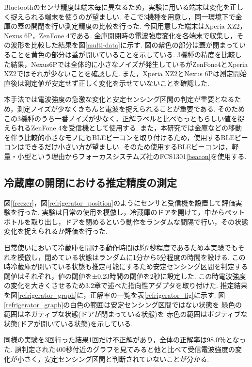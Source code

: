 \documentclass[Japanese]{dicomopapers}
\begin{document}
Bluetoothのセンサ精度は端末毎に異なるため，実験に用いる端末は変化を正しく捉えられる端末を使うのが望ましい.
そこで3機種を用意し，同一環境下で金庫の蓋の開閉を行い測定精度の比較を行った.
今回用意した端末はXperia XZ2，Nexus 6P，ZenFone 4である.
金庫開閉時の電波強度変化を各端末で収集し，その波形を比較した結果を図\ref{multi-data}に示す.
図の紫色の部分は蓋が閉まっていることを黄色の部分は蓋が開いていることを示している.
3機種の精度を比較した結果，Nexus6Pでは全体的に小さなノイズが発生しているがZenFone4とXperia XZ2ではそれが少ないことを確認した.
また，Xperia XZ2とNexus 6Pは測定開始直後は測定値が安定せず正しく変化を示せていないことを確認した.

本手法では電波強度の急激な変化と安定センシング区間の判定が重要となるため，測定ノイズが少なくきちんと電波を捉えられることが重要である.
そのためこの3機種のうち一番ノイズが少なく，正解ラベルと比べもっともらしい値を捉えられるZenFone 4を受信機として使用する.
また，本研究では金庫などの移動を伴う比較的小さなモノにもBLEビーコンを取り付けるため，使用するBLEビーコンはできるだけ小さい方が望ましい.
そのため使用するBLEビーコンは，軽量・小型という理由からフォーカスシステムズ社のFCS1301\ref{beacon}を使用する.


\subsection{冷蔵庫の開閉における推定精度の測定}
図\ref{freezer}，図\ref{refrigerator_position}のようにセンサと受信機を設置して評価実験を行った.
実験は日常の使用を模倣し，冷蔵庫のドアを開けて，中からペットボトルを取り出し，ドアを閉めるという動作をランダムな間隔で行い，その状態変化を捉えられるか評価を行った.

日常使いにおいて冷蔵庫を開ける動作時間は約7秒程度であるため本実験でもそれを模倣し，閉めている状態はランダムに1分から5分程度の時間を設ける.
この時冷蔵庫が開いている状態も推定可能にするため安定センシング区間を判定する閾値はそれぞれ，値の閾値を±0.23時間の閾値を2秒に設定した.
この時電波強度の変化を大きくさせるため3.2章で述べた指向性アダプタを取り付けた.
推定結果を図\ref{refrigerator_graph}に，正解率の一覧を表\ref{refrigerator_fig}に示す.
図\ref{refrigerator_graph}の白色の範囲は安定センシング区間ではない状態を 緑色の範囲はネガティブな状態(ドアが閉まっている状態)を 赤色の範囲はポジティブな状態(ドアが開いている状態)を示している.

同様の実験を3回行った結果1回だけ不正解があり，全体の正解率は98.0％となった.
誤判定された400秒付近のグラフを見てみると他と比べて受信電波強度の変化が小さく，安定センシング区間と判断されていないことが分かる.
\end{document}
